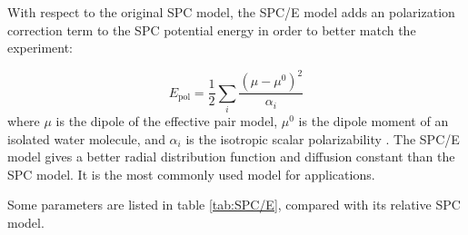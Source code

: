With respect to the original SPC model, the SPC/E model adds an polarization
correction term to the SPC potential energy in order to better match
the experiment:

\[
E_{\mathrm{pol}}=\frac{1}{2}\sum_{i}\dfrac{(\mu-\mu^{0})^{2}}{\alpha_{i}}
\]
where $\mu$ is the dipole of the effective pair model, $\mu^{0}$
is the dipole moment of an isolated water molecule, and $\alpha_{i}$
is the isotropic scalar polarizability \citep{SPC/E}. The SPC/E model
gives a better radial distribution function and diffusion constant
than the SPC model. It is the most commonly used model for applications.

Some parameters are listed in table \ref{tab:SPC/E}, compared with
its relative SPC model.

\begin{table}[h]

\caption{Parameters for SPC and SPC/E water\label{tab:SPC/E}}
\end{table}


